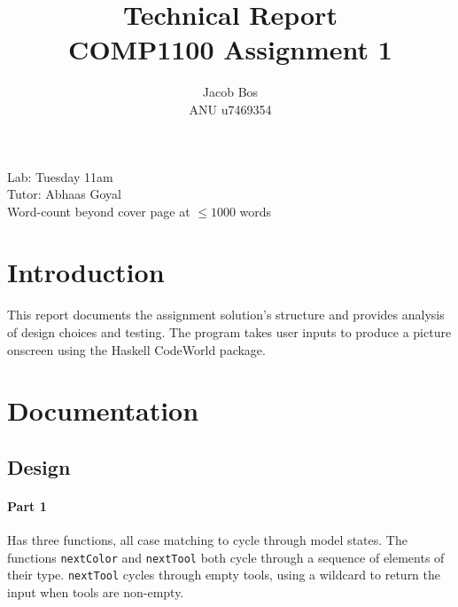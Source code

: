 \documentclass[11pt]{article}
\title{Technical Report\\ COMP1100 Assignment 1}
\author{Jacob Bos\\ ANU u7469354}
\begin{document}
\maketitle
{}
\begin{center}
  Lab: Tuesday 11am\\
  Tutor: Abhaas Goyal\\
  Word-count beyond cover page at $\leq 1000$ words
\end{center}
\tableofcontents
\newpage
{}
\section*{Introduction} 
This report documents the assignment solution's structure and provides analysis of design choices and testing. The program takes user inputs to produce a picture onscreen using the Haskell CodeWorld package. %


\section{Documentation}%
\subsection{Design}
\paragraph{Part 1} Has three functions, all case matching to cycle through model states. The functions \verb|nextColor| and  \verb|nextTool| both cycle through a sequence of elements of their type.  \verb|nextTool| cycles through empty tools, using a wildcard to return the input when tools are non-empty. %
\end{document}
